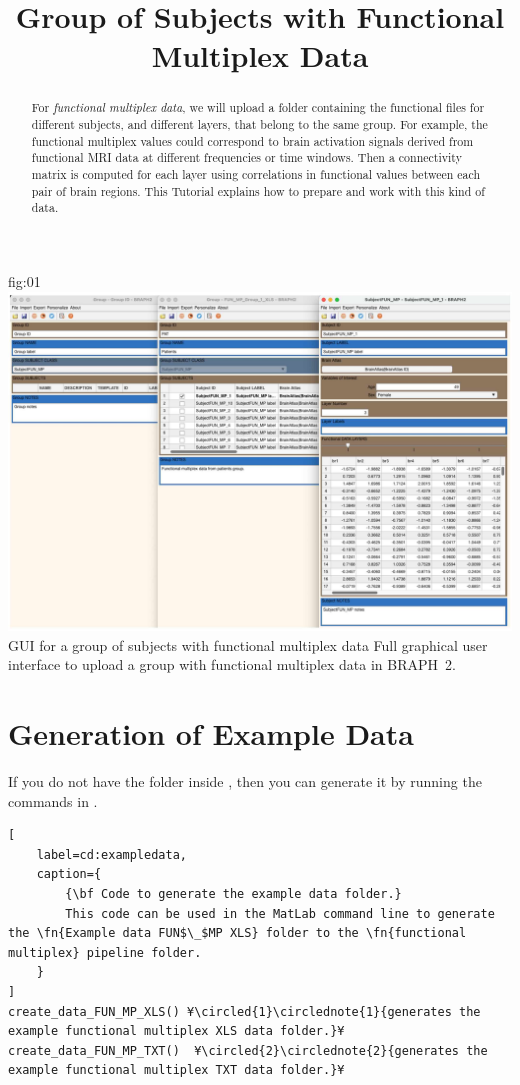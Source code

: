 \documentclass[justified]{tufte-handout}
\title{Group of Subjects with Functional Multiplex Data}
\begin{document}
\maketitle

\begin{abstract}
\noindent
For \emph{functional multiplex data}, we will upload a folder containing the functional files for different subjects, and different layers, that belong to the same group. For example, the functional multiplex values could correspond to brain activation signals derived from functional MRI data at different frequencies or time windows.  Then a connectivity matrix is computed for each layer using correlations in functional values between each pair of brain regions. This Tutorial explains how to prepare and work with this kind of data.
\end{abstract}


\tableofcontents

	{fig:01}
	{\includegraphics{fig01.jpg}}
	{GUI for a group of subjects with functional multiplex data}
	{
	Full graphical user interface to upload a group with functional multiplex data in BRAPH~2. 
	}

\clearpage
\section{Generation of Example Data}

If you do not have the  folder inside , then you can generate it by running the commands in .

\begin{lstlisting}[
	label=cd:exampledata,
	caption={
		{\bf Code to generate the example data folder.}
		This code can be used in the MatLab command line to generate the \fn{Example data FUN$\_$MP XLS} folder to the \fn{functional multiplex} pipeline folder.
	}
]
create_data_FUN_MP_XLS() ¥\circled{1}\circlednote{1}{generates the example functional multiplex XLS data folder.}¥
create_data_FUN_MP_TXT()  ¥\circled{2}\circlednote{2}{generates the example functional multiplex TXT data folder.}¥
\end{lstlisting}
\end{document}
